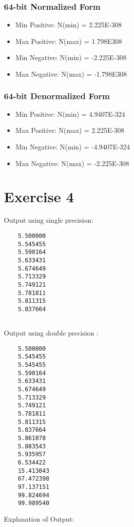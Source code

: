 \documentclass{article}
\begin{document}
\subsubsection{64-bit Normalized Form}

\begin{itemize}
    \item{Min Positive: N(min) = 2.225E-308}
    \item{Max Positive: N(max) = 1.798E308}
    \item{Min Negative: N(min) = -2.225E-308}
    \item{Max Negative: N(max) = -1.798E308}
\end{itemize}

\subsubsection{64-bit Denormalized Form}

\begin{itemize}
    \item{Min Positive: N(min) = 4.9407E-324}
    \item{Max Positive: N(max) = 2.225E-308}
    \item{Min Negative: N(min) = -4.9407E-324}
    \item{Max Negative: N(max) = -2.225E-308}
\end{itemize}

\newpage

\section{Exercise 4}

Output using single precision:
\begin{verbatim}
    5.500000
    5.545455
    5.590164
    5.633431
    5.674649
    5.713329
    5.749121
    5.781811
    5.811315
    5.837664
   
\end{verbatim}

Output using double precision :
\begin{verbatim}
    5.500000
    5.545455
    5.545455
    5.590164
    5.633431
    5.674649
    5.713329
    5.749121
    5.781811
    5.811315
    5.837664
    5.861078
    5.883543
    5.935957
    6.534422
    15.413043
    67.472398
    97.137151
    99.824694
    99.989540

\end{verbatim}

Explanation of Output:
\end{document}
